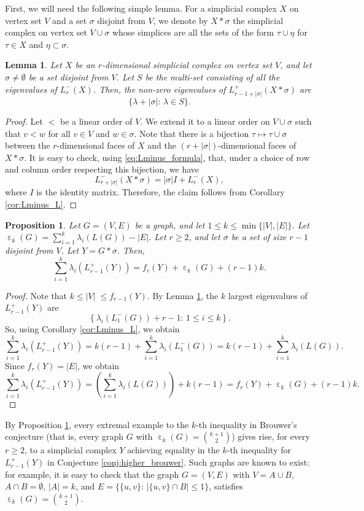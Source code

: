 \documentclass[a4paper,11pt]{article}
\theoremstyle{plain}
\newtheorem{proposition}[theorem]{\bf Proposition}
\newtheorem{lemma}[theorem]{\bf Lemma}
\theoremstyle{definition}
\numberwithin{theorem}{section}
\numberwithin{equation}{section}
\DeclareMathOperator{\eps}{\varepsilon}
\begin{document}
First, we will need the following simple lemma. For a simplicial complex $X$ on vertex set $V$ and a set $\sigma$ disjoint from $V$, we denote by $X\ast \sigma$ the simplicial complex on vertex set $V\cup \sigma$ whose simplices are all the sets of the form $\tau\cup\eta$ for $\tau\in X$ and $\eta\subset \sigma$.

\begin{lemma}\label{lemma:coning}
  Let $X$ be an $r$-dimensional simplicial complex on vertex set $V$, and let $\sigma\ne\emptyset$ be a set disjoint from $V$. 
  Let $S$ be the multi-set consisting of all the eigenvalues of $L_{r}^-(X)$. Then, the non-zero eigenvalues of $L^{+}_{r-1+|\sigma|}(X\ast\sigma)$ are
  \[    
    \{\lambda+|\sigma| :\, \lambda\in S\}.
  \]
\end{lemma}
\begin{proof}
    Let $<$ be a linear order of $V$. We extend it to a linear order on $V\cup\sigma$ such that $v<w$ for all $v\in V$ and $w\in \sigma$. Note that there is a bijection $\tau\mapsto \tau\cup\sigma$ between the $r$-dimensional faces of $X$ and the $(r+|\sigma|)$-dimensional faces of $X\ast \sigma$. It is easy to check, using \eqref{eq:Lminus_formula}, that, under a choice of row and column order respecting this bijection, we have
    \[
        L^-_{r+|\sigma|}(X\ast\sigma)=|\sigma|I+L^-_{r}(X),
    \]
    where $I$ is the identity matrix. Therefore, the claim follows from Corollary \ref{cor:Lminus_L}.
\end{proof}

\begin{proposition}\label{prop:extremal_brouwer_complexes}
    Let $G=(V,E)$ be a graph, and let $1\le k\le \min\{|V|,|E|\}$. Let $\eps_k(G)= \sum_{i=1}^k \lambda_i(L(G)) - |E|$. 
    Let $r\ge 2$, and let $\sigma$ be a set of size $r-1$ disjoint from $V$. Let 
    $Y=G\ast\sigma$.
    Then,
    \[
    \sum_{i=1}^{k} \lambda_i(L_{r-1}^+(Y)) = f_r(Y) + \eps_k(G) + (r-1)k.
    \]
\end{proposition}
\begin{proof}
Note that $k\le |V|\;\le f_{r-1}(Y)$.
By Lemma \ref{lemma:coning}, the $k$ largest eigenvalues of $L_{r-1}^{+}(Y)$ are
\[
    \left\{\lambda_i(L_1^-(G))+r-1 :\, 1\le i\le k\right\}.
\]
So, using Corollary \ref{cor:Lminus_L}, we obtain
\[
\sum_{i=1}^k \lambda_i(L_{r-1}^+(Y)) = k(r-1) + \sum_{i=1}^k \lambda_i(L_1^{-}(G)) = k(r-1) + \sum_{i=1}^k \lambda_i(L(G)). 
\]
Since $f_r(Y)=|E|$, we obtain
\[
\sum_{i=1}^{k} \lambda_i(L_{r-1}^+(Y))= \left(\sum_{i=1}^k \lambda_i(L(G))\right) + k(r-1) = f_r(Y) + \eps_k(G) + (r-1)k.
\]
\end{proof}
By Proposition \ref{prop:extremal_brouwer_complexes}, every extremal example to the $k$-th inequality in Brouwer's conjecture (that is, every graph $G$ with $\eps_k(G)=\binom{k+1}{2}$) gives rise, for every $r\ge 2$, to a simplicial complex $Y$ achieving equality in the $k$-th inequality for $L_{r-1}^+(Y)$ in Conjecture \ref{conj:higher_brouwer}.
Such graphs are known to exist: for example, it is easy to check that the graph $G=(V,E)$ with $V=A\cup B$, $A\cap B=\emptyset$, $|A|=k$, and $E=\{\{u,v\}:\, |\{u,v\}\cap B|\le 1\}$, satisfies $\eps_k(G)=\binom{k+1}{2}$.
\end{document}
